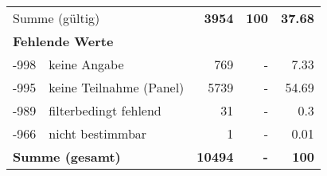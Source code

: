 \begin{longtable}{lXrrr}
     \midrule
     \multicolumn{2}{l}{Summe (gültig)} &
       \textbf{\num{3954}} &
     \textbf{\num{100}} &
       \textbf{\num[round-mode=places,round-precision=2]{37.68}} \\
     \multicolumn{5}{l}{\textbf{Fehlende Werte}}\\
       -998 &
       keine Angabe &
         \num{769} &
        - &
         \num[round-mode=places,round-precision=2]{7.33} \\
       -995 &
       keine Teilnahme (Panel) &
         \num{5739} &
        - &
         \num[round-mode=places,round-precision=2]{54.69} \\
       -989 &
       filterbedingt fehlend &
         \num{31} &
        - &
         \num[round-mode=places,round-precision=2]{0.3} \\
       -966 &
       nicht bestimmbar &
         \num{1} &
        - &
         \num[round-mode=places,round-precision=2]{0.01} \\
     \midrule
     \multicolumn{2}{l}{\textbf{Summe (gesamt)}} &
          \textbf{\num{10494}} &
        \textbf{-} &
        \textbf{\num{100}} \\
     \bottomrule
     \end{longtable}
     
